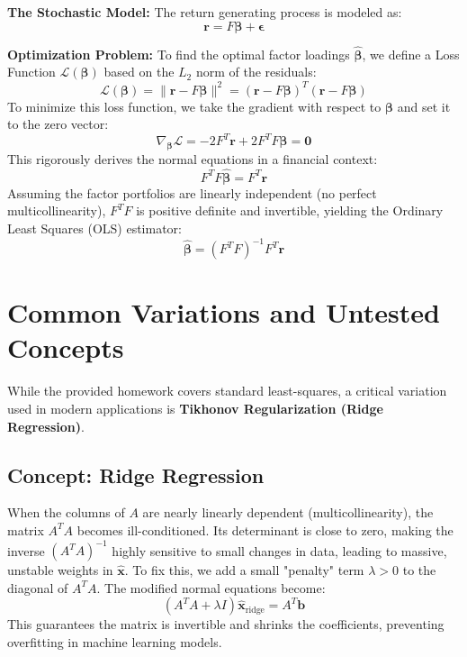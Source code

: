 \documentclass[11pt, letterpaper]{article}
\theoremstyle{definition}
\theoremstyle{remark}
\begin{document}
\textbf{The Stochastic Model:}
The return generating process is modeled as:
\[ \mathbf{r} = F\boldsymbol{\beta} + \boldsymbol{\epsilon} \]

\textbf{Optimization Problem:}
To find the optimal factor loadings $\hat{\boldsymbol{\beta}}$, we define a Loss Function $\mathcal{L}(\boldsymbol{\beta})$ based on the $L_2$ norm of the residuals:
\[ \mathcal{L}(\boldsymbol{\beta}) = \|\mathbf{r} - F\boldsymbol{\beta}\|^2 = (\mathbf{r} - F\boldsymbol{\beta})^T (\mathbf{r} - F\boldsymbol{\beta}) \]
To minimize this loss function, we take the gradient with respect to $\boldsymbol{\beta}$ and set it to the zero vector:
\[ \nabla_{\boldsymbol{\beta}} \mathcal{L} = -2F^T \mathbf{r} + 2F^T F \boldsymbol{\beta} = \mathbf{0} \]
This rigorously derives the normal equations in a financial context:
\[ F^T F \hat{\boldsymbol{\beta}} = F^T \mathbf{r} \]
Assuming the factor portfolios are linearly independent (no perfect multicollinearity), $F^T F$ is positive definite and invertible, yielding the Ordinary Least Squares (OLS) estimator:
\[ \hat{\boldsymbol{\beta}} = (F^T F)^{-1} F^T \mathbf{r} \]

\newpage
\section{Common Variations and Untested Concepts}

While the provided homework covers standard least-squares, a critical variation used in modern applications is \textbf{Tikhonov Regularization (Ridge Regression)}. 

\subsection{Concept: Ridge Regression}
When the columns of $A$ are nearly linearly dependent (multicollinearity), the matrix $A^T A$ becomes ill-conditioned. Its determinant is close to zero, making the inverse $(A^T A)^{-1}$ highly sensitive to small changes in data, leading to massive, unstable weights in $\hat{\mathbf{x}}$.
To fix this, we add a small "penalty" term $\lambda > 0$ to the diagonal of $A^T A$. The modified normal equations become:
\[ (A^T A + \lambda I) \hat{\mathbf{x}}_{\text{ridge}} = A^T \mathbf{b} \]
This guarantees the matrix is invertible and shrinks the coefficients, preventing overfitting in machine learning models.
\end{document}
